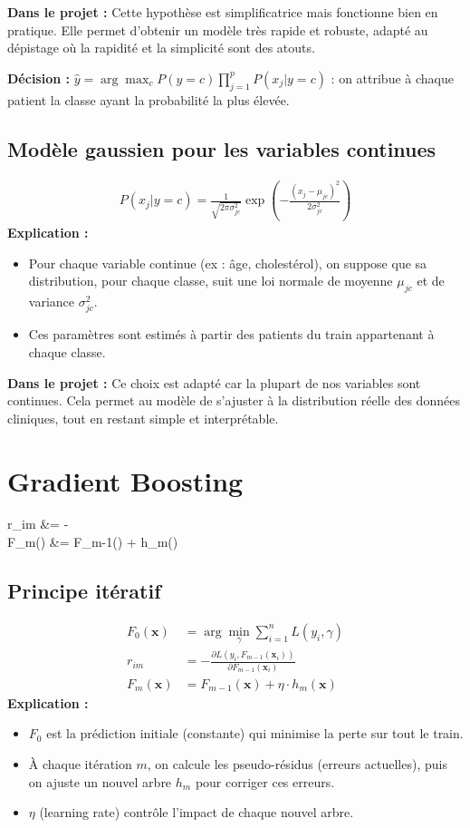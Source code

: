\documentclass[a4paper,12pt]{article}
\begin{document}
\textbf{Dans le projet :} Cette hypothèse est simplificatrice mais fonctionne bien en pratique. Elle permet d'obtenir un modèle très rapide et robuste, adapté au dépistage où la rapidité et la simplicité sont des atouts.

\textbf{Décision :} $\hat{y} = \arg\max_c P(y=c) \prod_{j=1}^p P(x_j|y=c)$ : on attribue à chaque patient la classe ayant la probabilité la plus élevée.


\subsection*{Modèle gaussien pour les variables continues}
\begin{align*}
P(x_j|y=c) = \frac{1}{\sqrt{2\pi\sigma_{jc}^2}} \exp\left(-\frac{(x_j - \mu_{jc})^2}{2\sigma_{jc}^2}\right)
\end{align*}
\textbf{Explication :}
\begin{itemize}
  \item Pour chaque variable continue (ex : âge, cholestérol), on suppose que sa distribution, pour chaque classe, suit une loi normale de moyenne $\mu_{jc}$ et de variance $\sigma_{jc}^2$.
  \item Ces paramètres sont estimés à partir des patients du train appartenant à chaque classe.
\end{itemize}

\textbf{Dans le projet :} Ce choix est adapté car la plupart de nos variables sont continues. Cela permet au modèle de s'ajuster à la distribution réelle des données cliniques, tout en restant simple et interprétable.

\section{Gradient Boosting}
r_{im} &= - \\
F_m() &= F_{m-1}() + \eta \cdot h_m()

\subsection*{Principe itératif}
\begin{align*}
F_0(\mathbf{x}) &= \arg\min_\gamma \sum_{i=1}^n L(y_i, \gamma) \\
r_{im} &= -\frac{\partial L(y_i, F_{m-1}(\mathbf{x}_i))}{\partial F_{m-1}(\mathbf{x}_i)} \\
F_m(\mathbf{x}) &= F_{m-1}(\mathbf{x}) + \eta \cdot h_m(\mathbf{x})
\end{align*}
\textbf{Explication :}
\begin{itemize}
  \item $F_0$ est la prédiction initiale (constante) qui minimise la perte sur tout le train.
  \item À chaque itération $m$, on calcule les pseudo-résidus (erreurs actuelles), puis on ajuste un nouvel arbre $h_m$ pour corriger ces erreurs.
  \item $\eta$ (learning rate) contrôle l'impact de chaque nouvel arbre.
\end{itemize}
\end{document}
